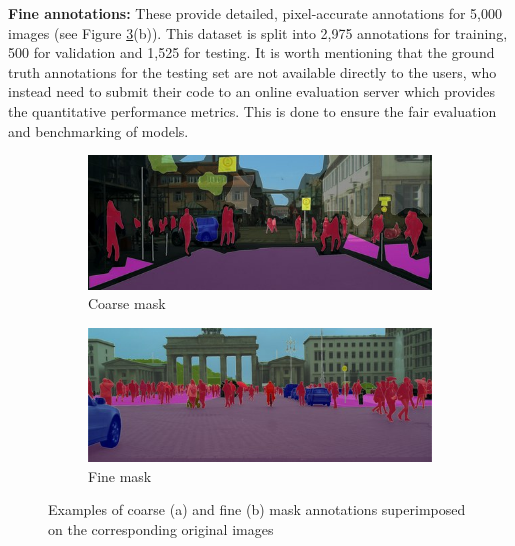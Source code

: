 \textbf{Fine annotations:} These provide detailed, pixel-accurate annotations for 5,000 images (see Figure \ref{fig:cityscapes}(b)). This dataset is split into 2,975 annotations for training, 500 for validation and 1,525 for testing. It is worth mentioning that the ground truth annotations for the testing set are not available directly to the users, who instead need to submit their code to an online evaluation server which provides the quantitative performance metrics. This is done to ensure the fair evaluation and benchmarking of models.

\begin{figure}[ht]
    \centering
    \begin{subfigure}{0.45\textwidth}
        \centering
        \includegraphics[width=\linewidth]{coarse_example.jpg}
        \caption{Coarse mask}
        \label{fig:sub1}
    \end{subfigure}\hfill
    \begin{subfigure}{0.45\textwidth}
        \centering
        \includegraphics[width=\linewidth]{fine_example.jpg}
        \caption{Fine mask}
        \label{fig:sub2}
    \end{subfigure}
    \caption{Examples of coarse (a) and fine (b) mask annotations superimposed on the corresponding original images}
    \label{fig:cityscapes}
\end{figure}

